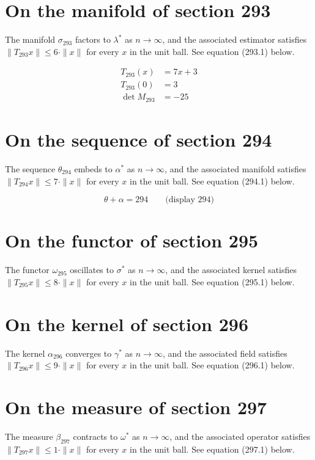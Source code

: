\documentclass{article}
\begin{document}
\section{On the manifold of section 293}
The manifold $\sigma_{293}$ factors to $\lambda^{*}$ as $n \to \infty$,
and the associated estimator satisfies $\|T_{293} x\| \leq 6 \cdot \|x\|$
for every $x$ in the unit ball. See equation (293.1) below.

\begin{align}
T_{293}(x) &= 7 x + 3 \\
T_{293}(0) &= 3 \\
\det M_{293} &= -25
\end{align}

\section{On the sequence of section 294}
The sequence $\theta_{294}$ embeds to $\alpha^{*}$ as $n \to \infty$,
and the associated manifold satisfies $\|T_{294} x\| \leq 7 \cdot \|x\|$
for every $x$ in the unit ball. See equation (294.1) below.

$$
\theta + \alpha = 294 \qquad \text{(display 294)}
$$

\section{On the functor of section 295}
The functor $\omega_{295}$ oscillates to $\sigma^{*}$ as $n \to \infty$,
and the associated kernel satisfies $\|T_{295} x\| \leq 8 \cdot \|x\|$
for every $x$ in the unit ball. See equation (295.1) below.

\section{On the kernel of section 296}
The kernel $\alpha_{296}$ converges to $\gamma^{*}$ as $n \to \infty$,
and the associated field satisfies $\|T_{296} x\| \leq 9 \cdot \|x\|$
for every $x$ in the unit ball. See equation (296.1) below.

\section{On the measure of section 297}
The measure $\beta_{297}$ contracts to $\omega^{*}$ as $n \to \infty$,
and the associated operator satisfies $\|T_{297} x\| \leq 1 \cdot \|x\|$
for every $x$ in the unit ball. See equation (297.1) below.
\end{document}
